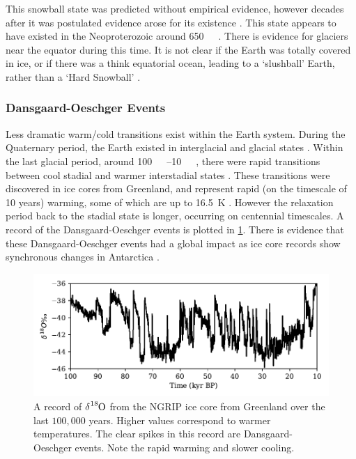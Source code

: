 This snowball state was predicted without empirical evidence, however decades after it was postulated evidence arose for its existence \parencite{Kirschvink1992,Hoffman2002}.
This state appears to have existed in the Neoproterozoic around \SI{650}{\mega\year\beforepresent}.
There is evidence for glaciers near the equator during this time. It is not clear
if the Earth was totally covered in ice, or if there was a think equatorial ocean, leading to a `slushball' Earth, rather than a `Hard Snowball' \parencite{Pierrehumbert2005,Pierrehumbert2011}.

\subsubsection{Dansgaard-Oeschger Events}
Less dramatic warm/cold transitions exist within the Earth system. During the Quaternary period, the Earth existed in interglacial and glacial states \parencite{Lisiecki2005}. Within the last glacial period,
around \SIrange{100}{10}{\kilo\year\beforepresent}, there were rapid transitions between cool stadial and warmer interstadial states \parencite{Oeschger1984,Dansgaard1993}. These transitions were discovered
in ice cores from Greenland, and represent rapid (on the timescale of 10 years) warming, some of which are up to \SI{16.5}{\kelvin} \parencite{Kindler2014}. However the relaxation period
back to the stadial state is longer, occurring on centennial timescales. A record of the Dansgaard-Oeschger events is plotted in \cref{fig:ngrip}. There is evidence that these Dansgaard-Oeschger events
had a global impact as ice core records show synchronous changes in Antarctica \parencite{Buizert2015}.

\begin{figure}
  \centering
  \includegraphics[width=\textwidth,keepaspectratio]{ngrip}
  \caption[NGRIP record of Dansgaard Oeschger events]{A record of $\delta \ce{^{18}O}$ from the NGRIP ice core from Greenland \parencite{NGRIP2004} over the last $100,000$ years.
    Higher values correspond to warmer temperatures. The clear spikes in this record are Dansgaard-Oeschger events. Note the rapid warming and slower cooling.}
  \label{fig:ngrip}
\end{figure}

